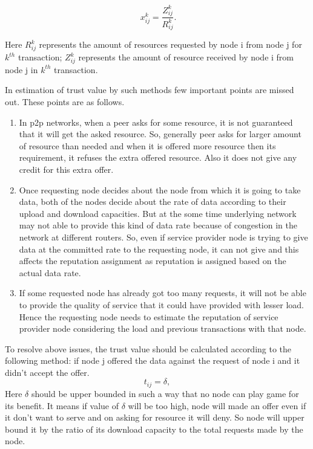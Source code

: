 \documentclass{IEEEtran}
\begin{document}
\begin{equation}\
  x^{k}_{ij}=\frac {Z^{k}_{ij}}{R^{k}_{ij}}.
\end{equation}

Here $ R^{k}_{ij} $ represents the amount of resources requested by node i from node j
for $k^{th}$ transaction;  $ Z^{k}_{ij} $ represents the amount of resource
received by node i from node j in $k^{th}$ transaction.

In estimation of trust value by such methods few important points are missed out. These points are as follows.
\begin{enumerate}
\item In p2p networks, when a peer asks for some resource, it is not guaranteed that it will get the asked resource. So, generally peer asks for larger amount of resource than needed and when it is offered more resource then its requirement, it refuses the extra offered resource. Also it does not give any credit for this extra offer.
\item Once requesting node decides about the node from which it is going to take data, both of the nodes decide about the rate of data according to their upload and download capacities. But at the some time underlying network may not able to provide this kind of data rate because of congestion in the network at different routers. So, even if service provider node is trying to give data at the committed rate to the requesting node, it can not give and this affects the reputation assignment as reputation is assigned based on the actual data rate.
\item If some requested node has already got too many requests, it will not be able to provide the quality of service that it could have provided with lesser load. Hence the requesting node needs to estimate the reputation of service provider node considering the load and previous transactions with that node.
\end{enumerate}
To resolve above issues, the trust value should be calculated according to the following method:
if node j offered the data against the request of node i and it didn't accept the offer.
\begin{equation}
t_{ij}=\delta,
\end{equation}
Here $\delta$ should be upper bounded in such a way that no node can play game for its benefit. It means if value of $\delta$ will be too high, node will made an offer even if it don't want to serve and on asking for resource it will deny. So node will upper bound it by the ratio of its download capacity to the total requests made by the node.
\end{document}
